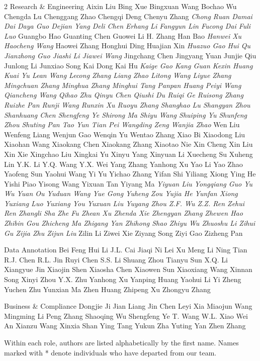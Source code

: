 \documentclass[11pt,a4paper]{article}
\begin{document}
2 Research \& Engineering Aixin Liu Bing Xue Bingxuan Wang Bochao Wu Chengda Lu Chenggang Zhao Chengqi Deng Chenyu Zhang\textit{ Chong Ruan Damai Dai Daya Guo Dejian Yang Deli Chen Erhang Li Fangyun Lin Fucong Dai Fuli Luo} Guangbo Hao Guanting Chen Guowei Li H. Zhang Han Bao\textit{ Hanwei Xu Haocheng Wang} Haowei Zhang Honghui Ding Huajian Xin\textit{ Huazuo Gao Hui Qu Jianzhong Guo Jiashi Li Jiawei Wang} Jingchang Chen Jingyang Yuan Junjie Qiu Junlong Li Junxiao Song Kai Dong Kai Hu\textit{ Kaige Gao Kang Guan Kexin Huang Kuai Yu Lean Wang Lecong Zhang Liang Zhao Litong Wang Liyue Zhang Mingchuan Zhang Minghua Zhang Minghui Tang Panpan Huang Peiyi Wang Qiancheng Wang Qihao Zhu Qinyu Chen Qiushi Du Ruiqi Ge Ruisong Zhang Ruizhe Pan Runji Wang Runxin Xu Ruoyu Zhang Shanghao Lu Shangyan Zhou Shanhuang Chen Shengfeng Ye Shirong Ma Shiyu Wang Shuiping Yu Shunfeng Zhou Shuting Pan Tao Yun Tian Pei Wangding Zeng Wanjia Zhao} Wen Liu Wenfeng Liang Wenjun Gao Wenqin Yu Wentao Zhang Xiao Bi Xiaodong Liu Xiaohan Wang Xiaokang Chen Xiaokang Zhang Xiaotao Nie Xin Cheng Xin Liu Xin Xie Xingchao Liu Xingkai Yu Xinyu Yang Xinyuan Li Xuecheng Su Xuheng Lin Y.K. Li Y.Q. Wang Y.X. Wei Yang Zhang Yanhong Xu Yao Li Yao Zhao Yaofeng Sun Yaohui Wang Yi Yu Yichao Zhang Yifan Shi Yiliang Xiong Ying He Yishi Piao Yisong Wang Yixuan Tan Yiyang Ma\textit{ Yiyuan Liu Yongqiang Guo Yu Wu Yuan Ou Yuduan Wang Yue Gong Yuheng Zou Yujia He Yunfan Xiong Yuxiang Luo Yuxiang You Yuxuan Liu Yuyang Zhou Z.F. Wu Z.Z. Ren Zehui Ren Zhangli Sha Zhe Fu Zhean Xu Zhenda Xie Zhengyan Zhang Zhewen Hao Zhibin Gou Zhicheng Ma Zhigang Yan Zhihong Shao Zhiyu Wu Zhuoshu Li Zihui Gu Zijia Zhu Zijun Liu} Zilin Li Ziwei Xie Ziyang Song Ziyi Gao Zizheng Pan

Data Annotation Bei Feng Hui Li J.L. Cai Jiaqi Ni Lei Xu Meng Li Ning Tian R.J. Chen R.L. Jin Ruyi Chen S.S. Li Shuang Zhou Tianyu Sun X.Q. Li Xiangyue Jin Xiaojin Shen Xiaosha Chen Xiaowen Sun Xiaoxiang Wang Xinnan Song Xinyi Zhou Y.X. Zhu Yanhong Xu Yanping Huang Yaohui Li Yi Zheng Yuchen Zhu Yunxian Ma Zhen Huang Zhipeng Xu Zhongyu Zhang

Business \& Compliance Dongjie Ji Jian Liang Jin Chen Leyi Xia Miaojun Wang Mingming Li Peng Zhang Shaoqing Wu Shengfeng Ye T. Wang W.L. Xiao Wei An Xianzu Wang Xinxia Shan Ying Tang Yukun Zha Yuting Yan Zhen Zhang

Within each role, authors are listed alphabetically by the first name. Names marked with * denote individuals who have departed from our team.
\end{document}
